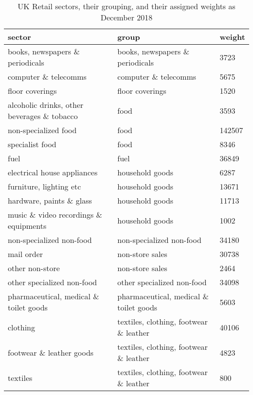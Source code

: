 \documentclass[a4paper,11pt,pdftex,twoside,titlepage]{article}
\begin{document}
\begin{table}[htb!]
  \centering
  \begin{tabular}{l|l|l}
    sector & group & weight\\
    \hline \hline
    books, newspapers \& periodicals & books, newspapers \& periodicals & 3723\\
    \hline
    computer \& telecomms & computer \& telecomms & 5675\\
    \hline
    floor coverings & floor coverings & 1520\\
    \hline
    alcoholic drinks, other beverages \& tobacco & food & 3593\\
    non-specialized food & food & 142507\\
    specialist food & food & 8346\\
    \hline
    fuel & fuel & 36849\\
    \hline
    electrical house appliances & household goods & 6287\\
    furniture, lighting etc & household goods & 13671\\
    hardware, paints \& glass & household goods & 11713\\
    music \& video recordings \& equipments & household goods & 1002\\
    \hline
    non-specialized non-food & non-specialized non-food & 34180\\
    \hline
    mail order & non-store sales & 30738\\
    other non-store & non-store sales & 2464\\
    \hline
    other specialized non-food & other specialized non-food & 34098\\
    \hline
    pharmaceutical, medical \& toilet goods & pharmaceutical, medical \& toilet goods & 5603\\
    \hline
    clothing & textiles, clothing, footwear \& leather & 40106\\
    footwear \& leather goods & textiles, clothing, footwear \& leather & 4823\\
    textiles & textiles, clothing, footwear \& leather & 800\\
  \end{tabular}
  \caption{UK Retail sectors, their grouping, and their assigned
    weights as December 2018}
  \label{tab:g5h6}
\end{table}
\end{document}
